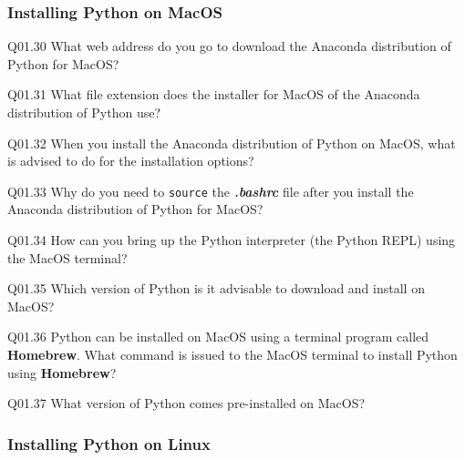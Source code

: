 \documentclass{book}
\newenvironment{problems}{}{}  %
\begin{document}
    




    
        \subsubsection{Installing Python on
MacOS}\label{installing-python-on-macos}
    




    
        \begin{problems}
        Q01.30 What web address do you go to download the Anaconda distribution
of Python for MacOS?

Q01.31 What file extension does the installer for MacOS of the Anaconda
distribution of Python use?

Q01.32 When you install the Anaconda distribution of Python on MacOS,
what is advised to do for the installation options?

Q01.33 Why do you need to \lstinline!source! the \textbf{\emph{.bashrc}}
file after you install the Anaconda distribution of Python for MacOS?

Q01.34 How can you bring up the Python interpreter (the Python REPL)
using the MacOS terminal?

Q01.35 Which version of Python is it advisable to download and install
on MacOS?

Q01.36 Python can be installed on MacOS using a terminal program called
\textbf{Homebrew}. What command is issued to the MacOS terminal to
install Python using \textbf{Homebrew}?

Q01.37 What version of Python comes pre-installed on MacOS?
        \end{problems}

    




    
        \subsubsection{Installing Python on
Linux}\label{installing-python-on-linux}
    
\end{document}
